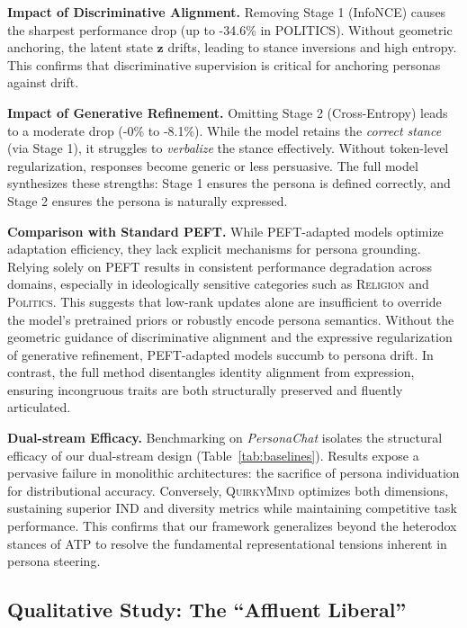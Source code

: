 \noindent \textbf{Impact of Discriminative Alignment.} 
Removing Stage 1 (InfoNCE) causes the sharpest performance drop (up to -34.6\% in \textsc{POLITICS}). Without geometric anchoring, the latent state $\mathbf{z}$ drifts, leading to stance inversions and high entropy. This confirms that discriminative supervision is critical for anchoring personas against drift.

\noindent \textbf{Impact of Generative Refinement.} 
Omitting Stage 2 (Cross-Entropy) leads to a moderate drop (-0\% to -8.1\%). While the model retains the \textit{correct stance} (via Stage 1), it struggles to \textit{verbalize} the stance effectively. Without token-level regularization, responses become generic or less persuasive. The full model synthesizes these strengths: Stage 1 ensures the persona is defined correctly, and Stage 2 ensures the persona is naturally expressed.

\noindent \textbf{Comparison with Standard PEFT.}
While PEFT-adapted models optimize adaptation efficiency, they lack explicit mechanisms for persona grounding. Relying solely on PEFT results in consistent performance degradation across domains, especially in ideologically sensitive categories such as \textsc{Religion} and \textsc{Politics}. This suggests that low-rank updates alone are insufficient to override the model's pretrained priors or robustly encode persona semantics. Without the geometric guidance of discriminative alignment and the expressive regularization of generative refinement, PEFT-adapted models succumb to persona drift. In contrast, the full method disentangles identity alignment from expression, ensuring incongruous traits are both structurally preserved and fluently articulated.


\noindent \textbf{Dual-stream Efficacy.}
Benchmarking on \textit{PersonaChat} isolates the structural efficacy of our dual-stream design (Table~\ref{tab:baselines}). Results expose a pervasive failure in monolithic architectures: the sacrifice of persona individuation for distributional accuracy. Conversely, \textsc{QuirkyMind} optimizes both dimensions, sustaining superior IND and diversity metrics while maintaining competitive task performance. This confirms that our framework generalizes beyond the heterodox stances of ATP to resolve the fundamental representational tensions inherent in persona steering.

\subsection{Qualitative Study: The ``Affluent Liberal''}\label{sec:rq4}


